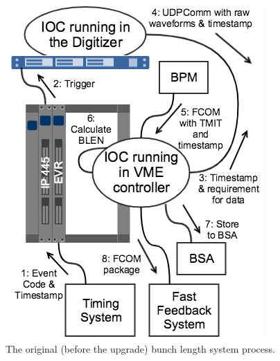 \documentclass[letter,
               biblatex,     %
               keeplastbox,   %
               ]{jacow}
\begin{document}
\begin{figure}[!htb]
   \centering
   \includegraphics*[width=\columnwidth]{BLEN_VME_Process}
   \caption{The original (before the upgrade) bunch length system process.}
   \label{fig:blen_vme}
\end{figure}
\end{document}

